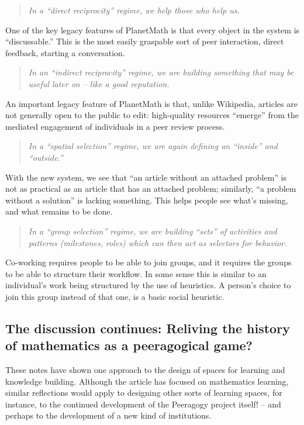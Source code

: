 \begin{quote}
\emph{In a ``direct reciprocity'' regime, we help those who help us.}
\end{quote}
One of the key legacy features of PlanetMath is that every object in the
system is ``discussable.'' This is the most easily graspable sort of
peer interaction, direct feedback, starting a conversation.

\begin{quote}
\emph{In an ``indirect reciprocity'' regime, we are building something
that may be useful later on -- like a good reputation.}
\end{quote}
An important legacy feature of PlanetMath is that, unlike Wikipedia,
articles are not generally open to the public to edit: high-quality
resources ``emerge'' from the mediated engagement of individuals in a
peer review process.

\begin{quote}
\emph{In a ``spatial selection'' regime, we are again defining an
``inside'' and ``outside.''}
\end{quote}
With the new system, we see that ``an article without an attached
problem'' is not as practical as an article that has an attached
problem; similarly, ``a problem without a solution'' is lacking
something. This helps people see what's missing, and what remains to be
done.

\begin{quote}
\emph{In a ``group selection'' regime, we are building ``sets'' of
activities and patterns (milestones, roles) which can then act as
selectors for behavior.}
\end{quote}
Co-working requires people to be able to join groups, and it requires
the groups to be able to structure their workflow. In some sense this is
similar to an individual's work being structured by the use of
heuristics. A person's choice to join this group instead of that one, is
a basic social heuristic.

\subsection{The discussion continues: Reliving the history of
mathematics as a peeragogical game?}

These notes have shown one approach to the design of spaces for learning
and knowledge building. Although the article has focused on mathematics
learning, similar reflections would apply to designing other sorts of
learning spaces, for instance, to the continued development of the
Peeragogy project itself! -- and perhaps to the development of a new
kind of institutions.

